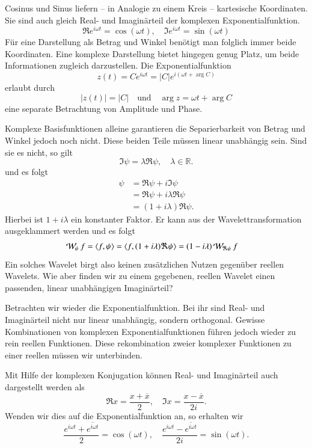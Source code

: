 Cosinus und Sinus liefern -- in Analogie zu einem Kreis -- kartesische Koordinaten. 
Sie sind auch gleich Real- und Imaginärteil der komplexen Exponentialfunktion.
\[
\Re e^{i\omega t} = \cos(\omega t), \quad \Im e^{i\omega t} = \sin(\omega t)
\]
Für eine Darstellung als Betrag und Winkel benötigt man folglich immer beide Koordinaten.
Eine komplexe Darstellung bietet hingegen genug Platz, um beide Informationen zugleich darzustellen.
Die Exponentialfunktion
\[
	z(t) = Ce^{i\omega t} = |C|e^{i(\omega t + \arg C)}
\]
erlaubt durch 
\[
	|z(t)| = |C| 
	\quad \text{und}\quad
	\arg z = \omega t + \arg C
\]
eine separate Betrachtung von Amplitude und Phase.


Komplexe Basisfunktionen alleine garantieren die Separierbarkeit von Betrag und Winkel jedoch noch nicht.
Diese beiden Teile müssen linear unabhängig sein.
Sind sie es nicht, so gilt
\[\Im \psi = \lambda \Re \psi, \quad \lambda \in \mathbb R.\]
und es folgt
\begin{align*}
	\psi &= \Re \psi + i \Im \psi\\
	&= \Re \psi + i\lambda \Re \psi\\
	&= (1+i\lambda) \Re \psi.
\end{align*}
Hierbei ist $1+i\lambda$ ein konstanter Faktor. 
Er kann aus der Wavelettransformation ausgeklammert werden und es folgt
\begin{align*}
	\Wave_\psi f 
	= \langle f, \psi \rangle
	&= \langle f, (1+i\lambda) \Re \psi \rangle
	= (1-i\lambda) \Wave_{\Re\psi}f
\end{align*}
Ein solches Wavelet birgt also keinen zusätzlichen Nutzen gegenüber reellen Wavelets.
Wie aber finden wir zu einem gegebenen, reellen Wavelet einen passenden, linear unabhängigen Imaginärteil?

Betrachten wir wieder die Exponentialfunktion.
Bei ihr sind Real- und Imaginärteil nicht nur linear unabhängig, sondern orthogonal.
Gewisse Kombinationen von komplexen Exponentialfunktionen führen jedoch wieder zu rein reellen Funktionen.
Diese rekombination zweier komplexer Funktionen zu einer reellen müssen wir unterbinden.

Mit Hilfe der komplexen Konjugation können Real- und Imaginärteil auch dargestellt werden als
\[
\Re x = \frac{x + \overline x}{2} 
,\quad
\Im x = \frac{x - \overline x}{2i}.
\]
Wenden wir dies auf die Exponentialfunktion an, so erhalten wir
\begin{equation}
	\frac{e^{i\omega t} + \overline{e^{i\omega t}}}{2} = \cos(\omega t)
	,\quad
	\frac{e^{i\omega t} - \overline{e^{i\omega t}}}{2i} = \sin(\omega t). \label{complex:euler}
\end{equation}

